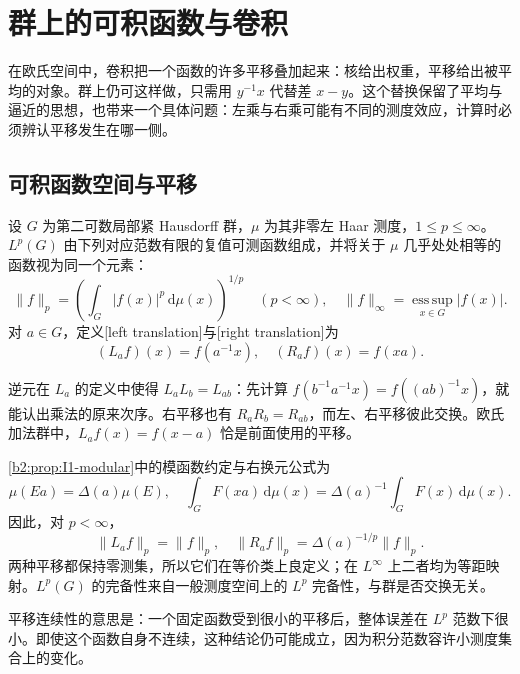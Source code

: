 \section{群上的可积函数与卷积}
\label{b2:sec:I202}

在欧氏空间中，卷积把一个函数的许多平移叠加起来：核给出权重，平移给出被平均的对象。群上仍可这样做，只需用 \(y^{-1}x\) 代替差 \(x-y\)。这个替换保留了平均与逼近的思想，也带来一个具体问题：左乘与右乘可能有不同的测度效应，计算时必须辨认平移发生在哪一侧。

\subsection{可积函数空间与平移}
\label{b2:subsec:I20201}

\begin{definition}[群上的函数空间与平移]
\label{b2:def:I2-lp-translation}
设 \(G\) 为第二可数局部紧 Hausdorff 群，\(\mu\) 为其非零左 Haar 测度，\(1\le p\le\infty\)。\(L^p(G)\) 由下列对应范数有限的复值可测函数组成，并将关于 \(\mu\) 几乎处处相等的函数视为同一个元素：
\[
 \|f\|_p=\left(\int_G|f(x)|^p\,\mathrm d\mu(x)\right)^{1/p}
 \quad(p<\infty),
 \quad \|f\|_\infty=\operatorname*{ess\,sup}_{x\in G}|f(x)|.
\]
对 \(a\in G\)，定义[left translation]与[right translation]为
\[
 (L_af)(x)=f(a^{-1}x),\quad (R_af)(x)=f(xa).
\]
\end{definition}

逆元在 \(L_a\) 的定义中使得 \(L_aL_b=L_{ab}\)：先计算
\(f(b^{-1}a^{-1}x)=f((ab)^{-1}x)\)，就能认出乘法的原来次序。右平移也有 \(R_aR_b=R_{ab}\)，而左、右平移彼此交换。欧氏加法群中，\(L_af(x)=f(x-a)\) 恰是前面使用的平移。

\cref{b2:prop:I1-modular}中的模函数约定与右换元公式为
\[
 \mu(Ea)=\Delta(a)\mu(E),\quad
 \int_G F(xa)\,\mathrm d\mu(x)
 =\Delta(a)^{-1}\int_G F(x)\,\mathrm d\mu(x).
\]
因此，对 \(p<\infty\)，
\begin{equation}
\label{b2:eq:I2-translation-norm}
 \|L_af\|_p=\|f\|_p,\quad
 \|R_af\|_p=\Delta(a)^{-1/p}\|f\|_p.
\end{equation}
两种平移都保持零测集，所以它们在等价类上良定义；在 \(L^\infty\) 上二者均为等距映射。\(L^p(G)\) 的完备性来自一般测度空间上的 \(L^p\) 完备性，与群是否交换无关。

平移连续性的意思是：一个固定函数受到很小的平移后，整体误差在 \(L^p\) 范数下很小。即使这个函数自身不连续，这种结论仍可能成立，因为积分范数容许小测度集合上的变化。

